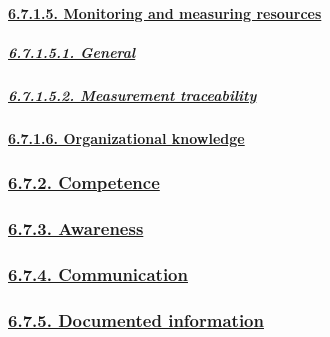 \documentclass[
]{article}
\begin{document}
\hypertarget{monitoring-and-measuring-resources}{%
\paragraph{\texorpdfstring{\protect\hyperlink{monitoring-and-measuring-resources-1}{6.7.1.5.
Monitoring and measuring
resources}}{6.7.1.5. Monitoring and measuring resources}}\label{monitoring-and-measuring-resources}}

\hypertarget{general-2}{%
\subparagraph{\texorpdfstring{\protect\hyperlink{general-11}{6.7.1.5.1.
General}}{6.7.1.5.1. General}}\label{general-2}}

\hypertarget{measurement-traceability}{%
\subparagraph{\texorpdfstring{\protect\hyperlink{measurement-traceability-1}{6.7.1.5.2.
Measurement
traceability}}{6.7.1.5.2. Measurement traceability}}\label{measurement-traceability}}

\hypertarget{organizational-knowledge}{%
\paragraph{\texorpdfstring{\protect\hyperlink{organizational-knowledge-1}{6.7.1.6.
Organizational
knowledge}}{6.7.1.6. Organizational knowledge}}\label{organizational-knowledge}}

\hypertarget{competence}{%
\subsubsection{\texorpdfstring{\protect\hyperlink{competence-1}{6.7.2.
Competence}}{6.7.2. Competence}}\label{competence}}

\hypertarget{awareness}{%
\subsubsection{\texorpdfstring{\protect\hyperlink{awareness-1}{6.7.3.
Awareness}}{6.7.3. Awareness}}\label{awareness}}

\hypertarget{communication}{%
\subsubsection{\texorpdfstring{\protect\hyperlink{communication-1}{6.7.4.
Communication}}{6.7.4. Communication}}\label{communication}}

\hypertarget{documented-information}{%
\subsubsection{\texorpdfstring{\protect\hyperlink{documented-information-1}{6.7.5.
Documented
information}}{6.7.5. Documented information}}\label{documented-information}}
\end{document}
